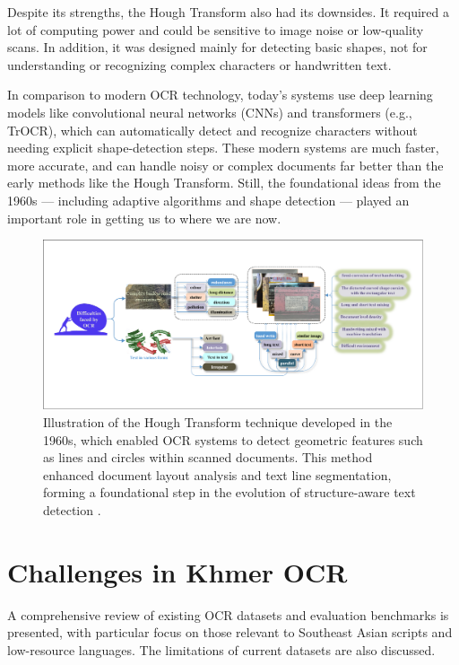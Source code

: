 Despite its strengths, the Hough Transform also had its downsides. It required a lot of 
computing power and could be sensitive to image noise or low-quality scans. In addition, 
it was designed mainly for detecting basic shapes, not for understanding or recognizing 
complex characters or handwritten text.

In comparison to modern OCR technology, today’s systems use deep learning models like 
convolutional neural networks (CNNs) and transformers (e.g., TrOCR), which can automatically 
detect and recognize characters without needing explicit shape-detection steps. These modern 
systems are much faster, more accurate, and can handle noisy or complex documents far better 
than the early methods like the Hough Transform. Still, the foundational ideas from the 
1960s — including adaptive algorithms and shape detection — played an important role in 
getting us to where we are now. 

\begin{figure}[ht]
    \centering
    \includegraphics[width=1\textwidth]{figures/Hough_Transform_technique.png}
    \caption{Illustration of the Hough Transform technique developed in the 1960s, 
    which enabled OCR systems to detect geometric features such as lines and circles 
    within scanned documents. This method enhanced document layout analysis and text 
    line segmentation, forming a foundational step in the evolution of 
    structure-aware text detection \cite{liu2023hough}.}
    \label{fig:hough-transform}
\end{figure}


\section{Challenges in Khmer OCR}
\label{sec:datasets}
A comprehensive review of existing OCR datasets and evaluation benchmarks is presented, with particular focus on those relevant to Southeast Asian scripts and low-resource languages. The limitations of current datasets are also discussed.


